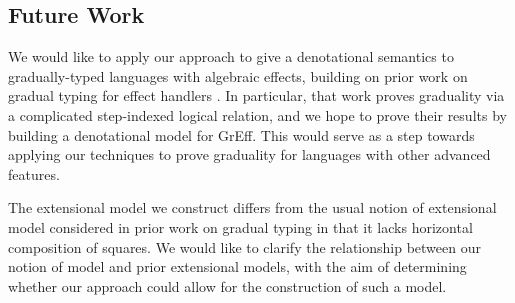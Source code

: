 \subsection{Future Work}
We would like to apply our approach to give a denotational semantics to gradually-typed
languages with algebraic effects, building on prior work on gradual typing for effect handlers
\cite{greff}. In particular, that work proves graduality via a complicated step-indexed logical relation,
and we hope to prove their results by building a denotational model for GrEff.
This would serve as a step towards applying our techniques to prove graduality for languages
with other advanced features.

The extensional model we construct differs from the usual notion of extensional
model considered in prior work on gradual typing in that it lacks horizontal composition of squares.
We would like to clarify the relationship between our notion of model and prior extensional models,
with the aim of determining whether our approach could allow for the construction of such a model.
